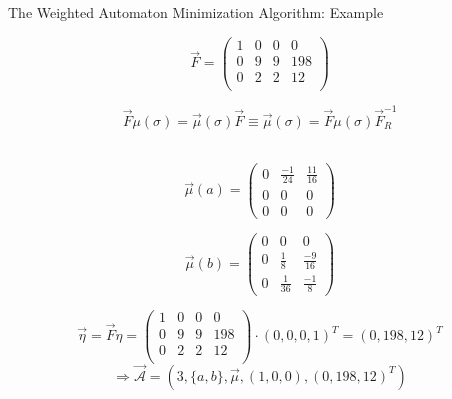 \documentclass[rgb, pdf]{beamer}
\begin{document}
\begin{frame}[allowframebreaks]{The Weighted Automaton Minimization Algorithm: Example}
\begin{minipage}{0.58\textwidth}
        \end{minipage}\begin{minipage}{0.4\textwidth}
         \[ \overrightarrow{F} = \begin{pmatrix}
                                    1 & 0 & 0 & 0 \\
                                    0 & 9 & 9 & 198 \\
                                    0 & 2 & 2 & 12  \\
                                \end{pmatrix}
        \]
        \end{minipage}

        \framebreak
        \[ \overrightarrow{F} \mu(\sigma) = \overrightarrow{\mu}(\sigma)\overrightarrow{F} 
        \equiv \overrightarrow{\mu}(\sigma) = \overrightarrow{F} \mu(\sigma) \overrightarrow{F}^{-1}_R \]
        \vspace{0.2cm} \\
        \begin{minipage}{0.48\textwidth}
         \[
        \overrightarrow{\mu}(a) = 
        \begin{pmatrix}
            0 & \frac{-1}{24} & \frac{11}{16} \\
            0 & 0 & 0 \\
            0 & 0 & 0
        \end{pmatrix}
       \]
        \end{minipage}\begin{minipage}{0.48\textwidth}
         \[ \overrightarrow{\mu}(b) = 
            \begin{pmatrix}
                0 & 0 & 0 \\
                0 & \frac{1}{8}& \frac{-9}{16} \\
                0 & \frac{1}{36} & \frac{-1}{8}
            \end{pmatrix}
        \] 
        \end{minipage}
        \vspace{0.05cm}
        \[ \overrightarrow{\eta} = \overrightarrow{F} \eta =  \begin{pmatrix}
                                    1 & 0 & 0 & 0 \\
                                    0 & 9 & 9 & 198 \\
                                    0 & 2 & 2 & 12  \\
                                \end{pmatrix} \cdot (0,0,0,1)^T = (0, 198, 12)^T \]
\vspace{0.5cm}
        \[\Rightarrow \overrightarrow{\mathcal{A}} = (3, \{a, b\}, \overrightarrow{\mu}, (1,0,0), (0, 198, 12)^T)\]
    \end{frame}
    
\end{document}
